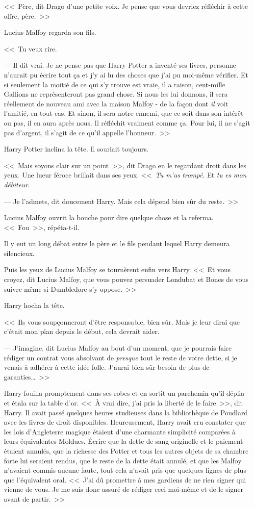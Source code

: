 <<~Père, dit Drago d'une petite voix. Je pense que vous devriez réfléchir à cette offre, père.~>>

Lucius Malfoy regarda son fils.

<<~Tu veux rire.

--- Il dit vrai. Je ne pense pas que Harry Potter a inventé ses livres, personne n'aurait pu écrire tout ça et j'y ai lu des choses que j'ai pu moi-même vérifier. Et si seulement la moitié de ce qui s'y trouve est vraie, il a raison, cent-mille Gallions ne représenteront pas grand chose. Si nous les lui donnons, il sera réellement de nouveau ami avec la maison Malfoy - de la façon dont \emph{il} voit l'amitié, en tout cas. Et sinon, il sera notre ennemi, que ce soit dans son intérêt ou pas, il en aura après nous. Il réfléchit vraiment comme ça. Pour lui, il ne s'agit pas d'argent, il s'agit de ce qu'il appelle l'honneur.~>>

Harry Potter inclina la tête. Il souriait toujours.

<<~Mais soyons clair sur un point~>>, dit Drago en le regardant droit dans les yeux. Une lueur féroce brillait dans ses yeux. <<~\emph{Tu m'as trompé.} Et \emph{tu es mon débiteur}.

--- Je l'admets, dit doucement Harry. Mais cela dépend bien sûr du reste.~>>

Lucius Malfoy ouvrit la bouche pour dire quelque chose et la referma. <<~Fou~>>, répéta-t-il.

Il y eut un long débat entre le père et le fils pendant lequel Harry demeura silencieux.

Puis les yeux de Lucius Malfoy se tournèrent enfin vers Harry. <<~Et vous croyez, dit Lucius Malfoy, que vous pouvez persuader Londubat et Bones de vous suivre même si Dumbledore s'y oppose.~>>

Harry hocha la tête.

<<~Ils vous soupçonneront d'être responsable, bien sûr. Mais je leur dirai que c'était mon plan depuis le début, cela devrait aider.

--- J'imagine, dit Lucius Malfoy au bout d'un moment, que je pourrais faire rédiger un contrat vous absolvant de \emph{presque} tout le reste de votre dette, si je venais à adhérer à cette idée folle. J'aurai bien sûr besoin de plus de garanties…~>>

Harry fouilla promptement dans ses robes et en sortit un parchemin qu'il déplia et étala sur la table d'or. <<~À vrai dire, j'ai pris la liberté de le faire~>>, dit Harry. Il avait passé quelques heures studieuses dans la bibliothèque de Poudlard avec les livres de droit disponibles. Heureusement, Harry avait cru constater que les lois d'Angleterre magique étaient d'une charmante simplicité comparées à leurs équivalentes Moldues. Écrire que la dette de sang originelle et le paiement étaient annulés, que la richesse des Potter et tous les autres objets de sa chambre forte lui seraient rendus, que le reste de la dette était annulé, et que les Malfoy n'avaient commis aucune faute, tout cela n'avait pris que quelques lignes de plus que l'équivalent oral. <<~J'ai dû promettre à mes gardiens de ne rien signer qui vienne de vous. Je me suis donc assuré de rédiger ceci moi-même et de le signer avant de partir.~>>

